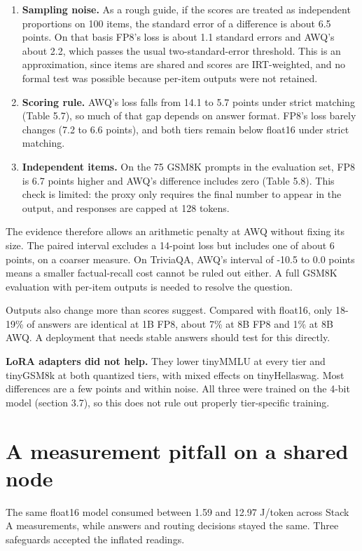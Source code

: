 \begin{enumerate}
\item \textbf{Sampling noise.} As a rough guide, if the scores are treated as independent proportions on 100 items, the standard error of a difference is about 6.5 points. On that basis FP8's loss is about 1.1 standard errors and AWQ's about 2.2, which passes the usual two-standard-error threshold. This is an approximation, since items are shared and scores are IRT-weighted, and no formal test was possible because per-item outputs were not retained.
\item \textbf{Scoring rule.} AWQ's loss falls from 14.1 to 5.7 points under strict matching (Table 5.7), so much of that gap depends on answer format. FP8's loss barely changes (7.2 to 6.6 points), and both tiers remain below float16 under strict matching.
\item \textbf{Independent items.} On the 75 GSM8K prompts in the evaluation set, FP8 is 6.7 points higher and AWQ's difference includes zero (Table 5.8). This check is limited: the proxy only requires the final number to appear in the output, and responses are capped at 128 tokens.
\end{enumerate}
The evidence therefore allows an arithmetic penalty at AWQ without fixing its size. The paired interval excludes a 14-point loss but includes one of about 6 points, on a coarser measure. On TriviaQA, AWQ's interval of -10.5 to 0.0 points means a smaller factual-recall cost cannot be ruled out either. A full GSM8K evaluation with per-item outputs is needed to resolve the question.

Outputs also change more than scores suggest. Compared with float16, only 18-19\% of answers are identical at 1B FP8, about 7\% at 8B FP8 and 1\% at 8B AWQ. A deployment that needs stable answers should test for this directly.

\textbf{LoRA adapters did not help.} They lower tinyMMLU at every tier and tinyGSM8k at both quantized tiers, with mixed effects on tinyHellaswag. Most differences are a few points and within noise. All three were trained on the 4-bit model (section 3.7), so this does not rule out properly tier-specific training.

\section{A measurement pitfall on a shared node}
The same float16 model consumed between 1.59 and 12.97 J/token across Stack A measurements, while answers and routing decisions stayed the same. Three safeguards accepted the inflated readings.


